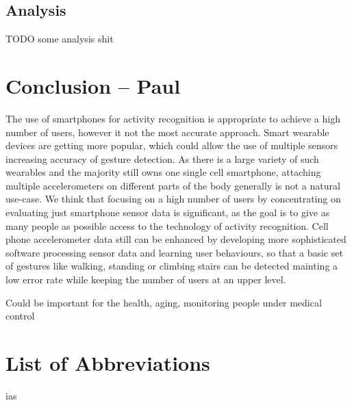 \documentclass[conference]{IEEEtran}
\begin{document}
\newpage
\subsection{Analysis}

TODO some analysis shit

\section{Conclusion -- Paul}
The use of smartphones for activity recognition is appropriate to achieve a high number of users, however it not the most accurate approach.
Smart wearable devices are getting more popular, which could allow the use of multiple sensors increasing accuracy of gesture detection. As there is a large variety of such wearables and the majority still owns one single cell smartphone, attaching multiple accelerometers  on different parts of the body generally is not a natural use-case. We think that focusing on a high number of users by concentrating on evaluating just smartphone sensor data is significant, as the goal is to give as many people as possible access to the technology of activity recognition.
Cell phone accelerometer data still can be enhanced by developing more sophisticated software processing sensor data and learning user behaviours, so that a basic set of gestures like walking, standing or climbing stairs can be detected mainting a low error rate while keeping the number of users at an upper level.

Could be important for the health, aging, monitoring people under medical control

\section*{List of Abbreviations}
\begin{acronym}[XXXXXXXX]
\end{acronym}
ias
\\
\\
\\
\\
\\
\\
\\
\\
\\
\\
\\
\\
\\
\\
\\
\\
\\
\\
\end{document}
